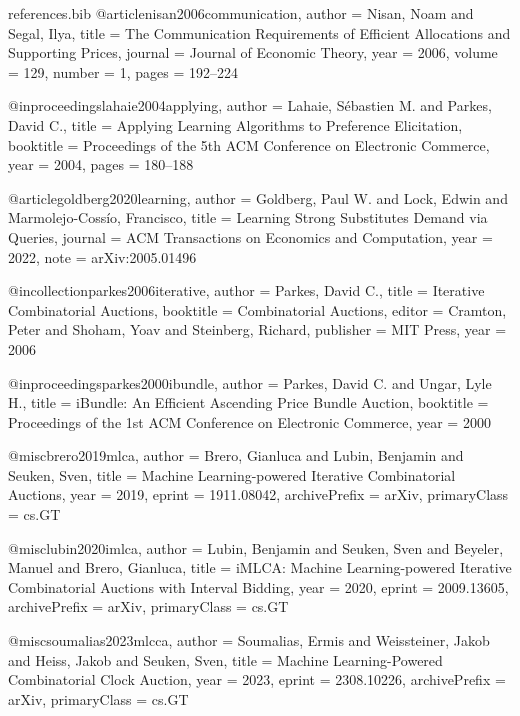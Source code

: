 \begin{filecontents*}{references.bib}
@article{nisan2006communication,
  author  = {Nisan, Noam and Segal, Ilya},
  title   = {The Communication Requirements of Efficient Allocations and Supporting Prices},
  journal = {Journal of Economic Theory},
  year    = {2006},
  volume  = {129},
  number  = {1},
  pages   = {192--224}
}

@inproceedings{lahaie2004applying,
  author    = {Lahaie, S{\'e}bastien M. and Parkes, David C.},
  title     = {Applying Learning Algorithms to Preference Elicitation},
  booktitle = {Proceedings of the 5th ACM Conference on Electronic Commerce},
  year      = {2004},
  pages     = {180--188}
}

@article{goldberg2020learning,
  author  = {Goldberg, Paul W. and Lock, Edwin and Marmolejo-Coss{\'i}o, Francisco},
  title   = {Learning Strong Substitutes Demand via Queries},
  journal = {ACM Transactions on Economics and Computation},
  year    = {2022},
  note    = {arXiv:2005.01496}
}

@incollection{parkes2006iterative,
  author    = {Parkes, David C.},
  title     = {Iterative Combinatorial Auctions},
  booktitle = {Combinatorial Auctions},
  editor    = {Cramton, Peter and Shoham, Yoav and Steinberg, Richard},
  publisher = {MIT Press},
  year      = {2006}
}

@inproceedings{parkes2000ibundle,
  author    = {Parkes, David C. and Ungar, Lyle H.},
  title     = {iBundle: An Efficient Ascending Price Bundle Auction},
  booktitle = {Proceedings of the 1st ACM Conference on Electronic Commerce},
  year      = {2000}
}

@misc{brero2019mlca,
  author        = {Brero, Gianluca and Lubin, Benjamin and Seuken, Sven},
  title         = {Machine Learning-powered Iterative Combinatorial Auctions},
  year          = {2019},
  eprint        = {1911.08042},
  archivePrefix = {arXiv},
  primaryClass  = {cs.GT}
}

@misc{lubin2020imlca,
  author        = {Lubin, Benjamin and Seuken, Sven and Beyeler, Manuel and Brero, Gianluca},
  title         = {iMLCA: Machine Learning-powered Iterative Combinatorial Auctions with Interval Bidding},
  year          = {2020},
  eprint        = {2009.13605},
  archivePrefix = {arXiv},
  primaryClass  = {cs.GT}
}

@misc{soumalias2023mlcca,
  author        = {Soumalias, Ermis and Weissteiner, Jakob and Heiss, Jakob and Seuken, Sven},
  title         = {Machine Learning-Powered Combinatorial Clock Auction},
  year          = {2023},
  eprint        = {2308.10226},
  archivePrefix = {arXiv},
  primaryClass  = {cs.GT}
}


\end{filecontents*}
